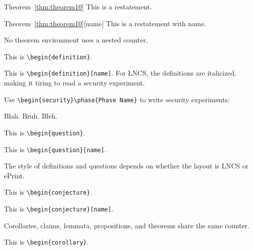 \begin{restated}{Theorem~\ref{thm:theorem10}}
This is a restatement.
\end{restated}

\begin{restated}{Theorem~\ref{thm:theorem10}}[name]
This is a restatement with name.
\end{restated}

\noindent
No theorem environment uses a nested counter.

\begin{definition}
This is \texttt{\textbackslash begin\{definition\}}.
\end{definition}

\begin{definition}[name]
This is \texttt{\textbackslash begin\{definition\}[name]}.
For LNCS, the definitions are italicized,
making it tiring to read a security experiment.

Use \texttt{\textbackslash begin\{security\}\textbackslash phase\{Phase Name\}}
to write security experiments:
\begin{security}
 Blah.
 Bruh.
 Bleh.
\end{security}
\end{definition}

\begin{question}
This is \texttt{\textbackslash begin\{question\}}.
\end{question}

\begin{question}[name]
This is \texttt{\textbackslash begin\{question\}[name]}.
\end{question}

\noindent
The style of definitions and questions depends on
whether the layout is LNCS or ePrint.

\begin{conjecture}
This is \texttt{\textbackslash begin\{conjecture\}}.
\end{conjecture}

\begin{conjecture}[name]
This is \texttt{\textbackslash begin\{conjecture\}[name]}.
\end{conjecture}

\noindent
Corollaries, claims, lemmata, propositions, and theorems
share the same counter.

\begin{corollary}
This is \texttt{\textbackslash begin\{corollary\}}.
\end{corollary}

